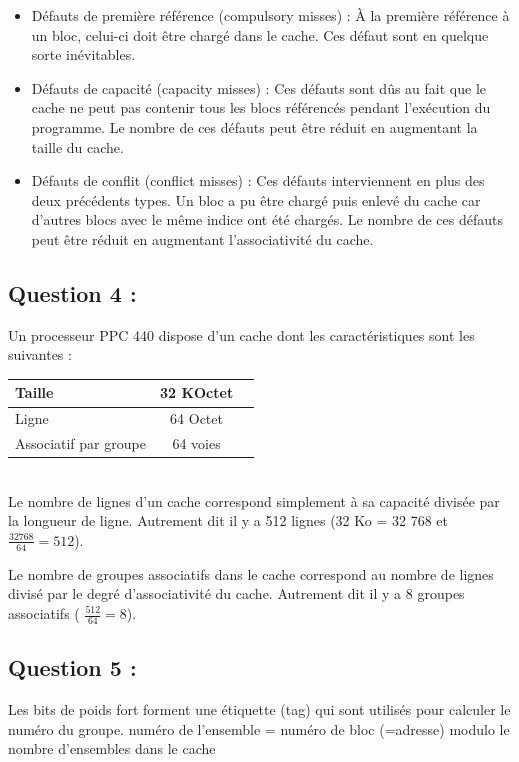 \documentclass[11pt,a4paper]{article}
\begin{document}
\begin{itemize}
    \item Défauts de première référence (compulsory misses) : À la première
      référence à un bloc, celui-ci doit être chargé dans le cache. Ces défaut
      sont en quelque sorte inévitables.
    \item Défauts de capacité (capacity misses) : Ces défauts sont dûs au fait
      que le cache ne peut pas contenir tous les blocs référencés pendant
      l'exécution du programme. Le nombre de ces défauts peut être réduit en
      augmentant la taille du cache.
    \item Défauts de conflit (conflict misses) : Ces défauts interviennent en
      plus des deux précédents types. Un bloc a pu être chargé puis enlevé du
      cache car d'autres blocs avec le même indice ont été chargés. Le nombre de
      ces défauts peut être réduit en augmentant l'associativité du cache.
\end{itemize}
    
    \subsection{Question 4 :}

Un processeur PPC 440 dispose d’un cache dont les caractéristiques sont les
suivantes : \\

\begin{center}
    \begin{tabular}{|l|c|r|}
      \hline
      Taille & 32 KOctet \\
      \hline
      Ligne & 64 Octet\\
      Associatif par groupe & 64 voies \\
      \hline
    \end{tabular}
\end{center}
\\

Le nombre de lignes d’un cache correspond simplement à sa capacité divisée par
la longueur de ligne. Autrement dit il y a 512 lignes (32 Ko = 32 768 et $
\frac{32768}{64} = 512 $).

Le nombre de groupes associatifs dans le cache correspond au nombre de lignes
divisé par le degré d’associativité du cache. Autrement dit il y a 8 groupes
associatifs ( $ \frac{512}{64} = 8 $).

    \subsection{Question 5 :}
Les bits de poids fort forment une étiquette (tag) qui sont utilisés pour calculer le numéro du groupe.
numéro de l’ensemble = 
numéro de bloc (=adresse) modulo  le nombre  d’ensembles dans le cache
\end{document}
